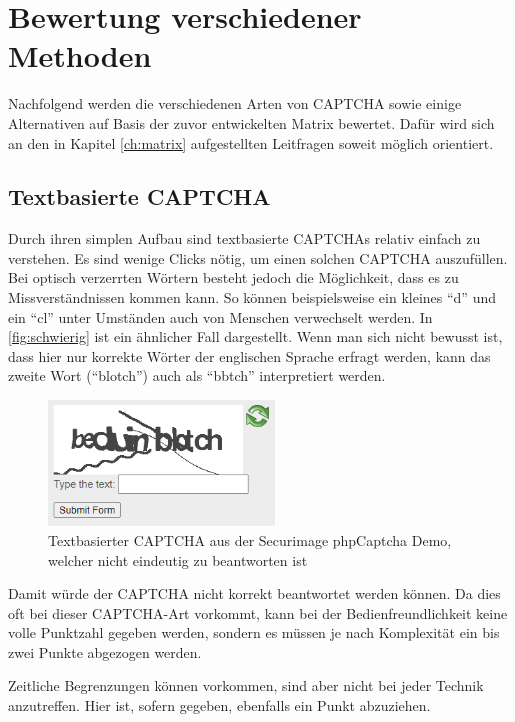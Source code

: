 \chapter{Bewertung verschiedener Methoden}
\label{ch:bewertung}

Nachfolgend werden die verschiedenen Arten von CAPTCHA sowie einige Alternativen auf Basis der zuvor entwickelten Matrix bewertet. 
Dafür wird sich an den in Kapitel \ref{ch:matrix} aufgestellten Leitfragen soweit möglich orientiert.

\section{Textbasierte CAPTCHA}
\label{ch:bewertung:text}
Durch ihren simplen Aufbau sind textbasierte CAPTCHAs relativ einfach zu verstehen.
Es sind wenige Clicks nötig, um einen solchen CAPTCHA auszufüllen. 
Bei optisch verzerrten Wörtern besteht jedoch die Möglichkeit, dass es zu Missverständnissen kommen kann.
So können beispielsweise ein kleines ``d'' und ein ``cl'' unter Umständen auch von Menschen verwechselt werden. 
In \autoref{fig:schwierig} ist ein ähnlicher Fall dargestellt. 
Wenn man sich nicht bewusst ist, dass hier nur korrekte Wörter der englischen Sprache erfragt werden,
kann das zweite Wort (``blotch'') auch als ``bbtch'' interpretiert werden.

\begin{figure}[h!]
    \centering
    \includegraphics[width=6cm]{gfx/mygraphics/schwierig4.png}
    \caption{Textbasierter CAPTCHA aus der Securimage phpCaptcha Demo, welcher nicht eindeutig zu beantworten ist}
    \label{fig:schwierig}
\end{figure}

Damit würde der CAPTCHA nicht korrekt beantwortet werden können.
Da dies oft bei dieser CAPTCHA-Art vorkommt, kann bei der Bedienfreundlichkeit keine volle Punktzahl gegeben werden,
sondern es müssen je nach Komplexität ein bis zwei Punkte abgezogen werden.

Zeitliche Begrenzungen können vorkommen, sind aber nicht bei jeder Technik anzutreffen.
Hier ist, sofern gegeben, ebenfalls ein Punkt abzuziehen.

